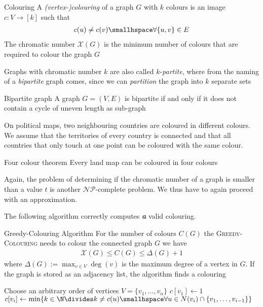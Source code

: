 \begin{definition}[]{Colouring}
    A \textit{(vertex-)colouring} of a graph $G$ with $k$ colours is an image $c: V \rightarrow [k]$ such that
    \begin{align*}
        c(u) \neq c(v) \smallhspace \forall \{u, v\} \in E
    \end{align*}
    The chromatic number $\mathscr{X}(G)$ is the minimum number of colours that are required to colour the graph $G$
\end{definition}
Graphs with chromatic number $k$ are also called $k$-\textit{partite}, where from the naming of a \textit{bipartite} graph comes, since we can \textit{partition} the graph into $k$ separate sets
\begin{theorem}[]{Bipartite graph}
    A graph $G = (V, E)$ is bipartite if and only if it does not contain a cycle of uneven length as sub-graph
\end{theorem}
On political maps, two neighbouring countries are coloured in different colours.
We assume that the territories of every country is connected and that all countries that only touch at one point can be coloured with the same colour.
\begin{theorem}[]{Four colour theorem}
    Every land map can be coloured in four colours
\end{theorem}
Again, the problem of determining if the chromatic number of a graph is smaller than a value $t$ is another $\mathcal{N}\mathcal{P}$-complete problem. We thus have to again proceed with an approximation.

The following algorithm correctly computes \textit{\textbf{a}} valid colouring.
\begin{theorem}[]{Greedy-Colouring Algorithm}
    For the number of colours $C(G)$ the \textsc{Greedy-Colouring} needs to colour the connected graph $G$ we have
    \begin{align*}
        \mathscr{X}(G) \leq C(G) \leq \Delta(G) + 1
    \end{align*}
    where $\Delta(G) := \max_{v\in V}\deg(v)$ is the maximum degree of a vertex in $G$. If the graph is stored as an adjacency list, the algorithm finds a colouring 
\end{theorem}

\begin{algorithm}
    \caption{\textsc{Greedy-Colouring}$(G)$}
    \begin{algorithmic}[1]
        \State Choose an arbitrary order of vertices $V = \{v_1, \ldots, v_n\}$
        \State $c[v_1] \gets 1$
            \State $c[v_i] \gets \min \{k \in \N \divides k \neq c(u) \smallhspace \forall u \in N(v_i) \cap \{v_1, \ldots, v_{i - 1}\}\}$ 
        \EndFor
    \end{algorithmic}
\end{algorithm}

